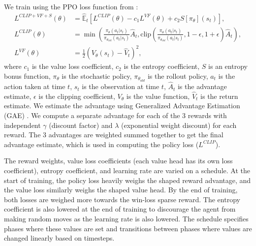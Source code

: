 \documentclass{article}
\begin{document}
We train using the PPO loss function from \citet{DBLP:journals/corr/SchulmanWDRK17}:
\begin{align}
    L^{CLIP+VF+S}(\theta) &= \hat{\mathbb{E}}_t \left[ L^{CLIP}(\theta) - c_1 L^{VF}(\theta) + c_2 S\left[\pi_\theta\right](s_t) \right], \\
    L^{CLIP}(\theta) &= \min \left( \frac{\pi_\theta(a_t|s_t)}{\pi_{\theta_{old}}(a_t|s_t)} \hat{A}_t, \text{clip}\left( \frac{\pi_\theta(a_t|s_t)}{\pi_{\theta_{old}}(a_t|s_t)}, 1-\epsilon, 1+\epsilon \right) \hat{A}_t \right), \\
    L^{VF}(\theta) &= \frac{1}{2} \left( V_\theta(s_t) - \hat{V}_t \right)^2,
\end{align}
where $c_1$ is the value loss coefficient, $c_2$ is the entropy coefficient, $S$ is an
entropy bonus function, $\pi_\theta$ is the stochastic policy, $\pi_{\theta_{old}}$ is the rollout policy, $a_t$
is the action taken at time $t$, $s_t$ is the observation at time $t$, $\hat{A}_t$
is the advantage estimate,  $\epsilon$ is the clipping coefficient, $V_\theta$ is the
value function, $\hat{V}_t$ is the return estimate. We estimate the advantage
using Generalized Advantage Estimation (GAE) \citep{DBLP:journals/corr/SchulmanMLJA15}.
We compute a separate advantage for each of the 3 rewards with independent $\gamma$
(discount factor) and $\lambda$ (exponential weight discount) for each reward. The 3 
advantages are weighted summed together to get the final advantage estimate, which is
used in computing the policy loss ($L^{CLIP}$).

The reward weights, value loss coefficients (each value
head has its own loss coefficient), entropy coefficient, and learning rate are varied on
a schedule. At the start of training, the policy loss heavily weighs the shaped 
reward advantage, and the value loss similarly weighs the shaped value head. By the end
of training, both losses are weighed more towards the win-loss sparse reward. The entropy coefficient is also
lowered at the end of training to discourage the agent from making random moves as the
learning rate is also lowered. The schedule specifies phases where these values are set and
transitions between phases where values are changed linearly based on timesteps.
\end{document}
